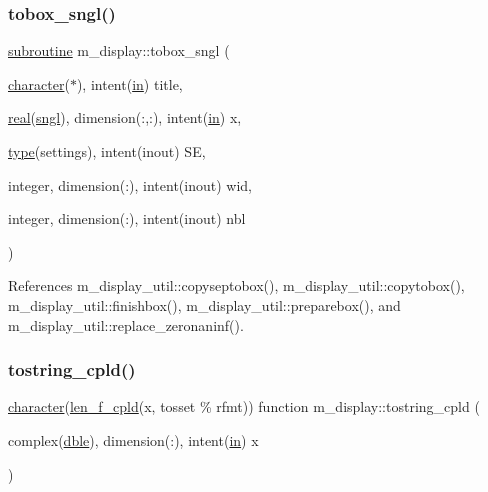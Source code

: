 \subsubsection{\texorpdfstring{tobox\+\_\+sngl()}{tobox\_sngl()}}
{\footnotesize\ttfamily \hyperlink{M__stopwatch_83_8txt_acfbcff50169d691ff02d4a123ed70482}{subroutine} m\+\_\+display\+::tobox\+\_\+sngl (\begin{DoxyParamCaption}\item[{\hyperlink{option__stopwatch_83_8txt_abd4b21fbbd175834027b5224bfe97e66}{character}($\ast$), intent(\hyperlink{M__journal_83_8txt_afce72651d1eed785a2132bee863b2f38}{in})}]{title,  }\item[{\hyperlink{read__watch_83_8txt_abdb62bde002f38ef75f810d3a905a823}{real}(\hyperlink{namespacem__display_a2ac86bc535c3ccc5947dbb3109c666b5}{sngl}), dimension(\+:,\+:), intent(\hyperlink{M__journal_83_8txt_afce72651d1eed785a2132bee863b2f38}{in})}]{x,  }\item[{\hyperlink{stop__watch_83_8txt_a70f0ead91c32e25323c03265aa302c1c}{type}(settings), intent(inout)}]{SE,  }\item[{integer, dimension(\+:), intent(inout)}]{wid,  }\item[{integer, dimension(\+:), intent(inout)}]{nbl }\end{DoxyParamCaption})\hspace{0.3cm}{\ttfamily [private]}}



References m\+\_\+display\+\_\+util\+::copyseptobox(), m\+\_\+display\+\_\+util\+::copytobox(), m\+\_\+display\+\_\+util\+::finishbox(), m\+\_\+display\+\_\+util\+::preparebox(), and m\+\_\+display\+\_\+util\+::replace\+\_\+zeronaninf().

\mbox{\label{namespacem__display_a12b973ec5880a8f0d789fbdf433d177f}} 
\subsubsection{\texorpdfstring{tostring\+\_\+cpld()}{tostring\_cpld()}}
{\footnotesize\ttfamily \hyperlink{option__stopwatch_83_8txt_abd4b21fbbd175834027b5224bfe97e66}{character}(\hyperlink{namespacem__display_a803611d2a793f2a4aa7563b6c8295cb3}{len\+\_\+f\+\_\+cpld}(x, tosset \% rfmt)) function m\+\_\+display\+::tostring\+\_\+cpld (\begin{DoxyParamCaption}\item[{complex(\hyperlink{namespacem__display_a46d90b75b6ccef7ccade133e5847e815}{dble}), dimension(\+:), intent(\hyperlink{M__journal_83_8txt_afce72651d1eed785a2132bee863b2f38}{in})}]{x }\end{DoxyParamCaption})\hspace{0.3cm}{\ttfamily [private]}}



